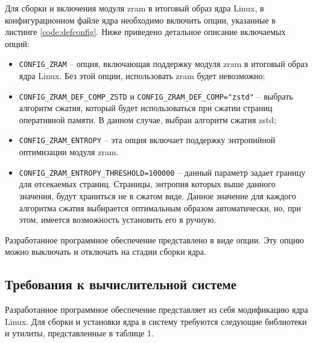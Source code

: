 Для сборки и включения модуля zram в итоговый образ ядра Linux, в конфигурационном файле ядра необходимо включить опции, указанные в листинге \ref{code:defconfig}. Ниже приведено детальное описание включаемых опций:

\begin{itemize}
	\item \texttt{CONFIG\_ZRAM} -- опция, включающая поддержку модуля zram в итоговый образ ядра Linux. Без этой опции, использовать zram будет невозможно;
	\item \texttt{CONFIG\_ZRAM\_DEF\_COMP\_ZSTD} и \texttt{CONFIG\_ZRAM\_DEF\_COMP="zstd"} -- выбрать алгоритм сжатия, который будет использоваться при сжатии страниц оперативной памяти. В данном случае, выбран алгоритм сжатия zstd;
	\item \texttt{CONFIG\_ZRAM\_ENTROPY} -- эта опция включает поддержку энтропийной оптимизации модуля zram.
	\item \texttt{CONFIG\_ZRAM\_ENTROPY\_THRESHOLD=100000} -- данный параметр задает границу для отсекаемых страниц. Страницы, энтропия которых выше данного значения, будут храниться не в сжатом виде. Данное значение для каждого алгоритма сжатия выбирается оптимальным образом автоматически, но, при этом, имеется возможность установить его в ручную.
\end{itemize}
Разработанное программное обеспечение представлено в виде опции. Эту опцию можно выключать и отключать на стадии сборки ядра.


\subsection{Требования к вычислительной системе}

Разработанное программное обеспечение представляет из себя модификацию ядра Linux. Для сборки и установки ядра в систему требуются следующие библиотеки и утилиты, представленные в таблице 1.

